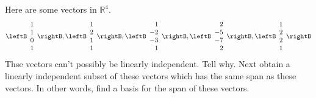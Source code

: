 \begin{enumialphparenastyle}
\begin{ex} Here are some vectors in $\mathbb{R}^{4}$. 
\begin{equation*}
\leftB 
\begin{array}{r}
1 \\ 
1 \\ 
0 \\ 
1
\end{array}
\rightB ,\leftB 
\begin{array}{r}
1 \\ 
2 \\ 
1 \\ 
1
\end{array}
\rightB ,\leftB 
\begin{array}{r}
1 \\ 
-2 \\ 
-3 \\ 
1
\end{array}
\rightB ,\leftB 
\begin{array}{r}
2 \\ 
-5 \\ 
-7 \\ 
2
\end{array}
\rightB ,\leftB 
\begin{array}{r}
1 \\ 
2 \\ 
2 \\ 
1
\end{array}
\rightB
\end{equation*}
Thse vectors can't possibly be linearly independent. Tell why. Next obtain a
linearly independent subset of these vectors which has the same span as
these vectors. In other words, find a basis for the span of these vectors.
\end{ex}


\end{enumialphparenastyle}
